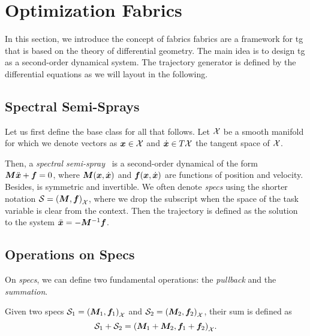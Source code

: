 
\section{Optimization Fabrics} %
\label{sec:optimization_fabrics}

In this section, we introduce the concept of \acf{fabrics}
\ac{fabrics} are a framework for \ac{tg}
that is based on the theory of differential
geometry. The main idea is to design \ac{tg} as a
second-order dynamical system. The trajectory generator is
defined by the differential equations as we will layout in
the following.

\subsection{Spectral Semi-Sprays} %
\label{sub:spectral_semi_sprays}

Let us first define the base class for all that follows.
Let $\mathcal{X}$ be a smooth manifold for which we denote vectors as 
$\bm{x}\in\mathcal{X}$ and $\dot{\bm{x}}\in T\mathcal{X}$ the tangent space of $\mathcal{X}$.

Then, a \textit{spectral semi-spray}~\cite{Ratliff2020} is a
second-order dynamical of the form $\bm{M}\ddot{\bm{x}} + \bm{f} = 0$,
where $\bm{M}(\bm{x},\dot{\bm{x}})$ and $\bm{f}(\bm{x},\dot{\bm{x}})$ are functions of
position and velocity. Besides, \M{} is symmetric and
invertible. We often denote \textit{specs} using the shorter
notation $\mathcal{S} = \left(\bm{M},\bm{f}\right)_{\mathcal{X}}$, where we drop the subscript when
the space of the task variable is clear from the context.
Then the trajectory is defined as the solution to the system
$\ddot{\bm{x}}=-\bm{M}^{-1}\bm{f}$.


\subsection{Operations on Specs} %
\label{sub:operations_on_specs}

On \textit{specs}, we can define two fundamental operations:
the \textit{pullback} and the \textit{summation}.

Given two specs $\mathcal{S}_1 = {\left(\bm{M}_1,\bm{f}_1\right)}_{\mathcal{X}}$ and
$\mathcal{S}_2 = {\left(\bm{M}_2,\bm{f}_2\right)}_{\mathcal{X}}$, their sum is
defined as
\begin{equation}
  \mathcal{S}_1 + \mathcal{S}_2 = {\left(\bm{M}_1 + \bm{M}_2, \bm{f}_1 + \bm{f}_2\right)}_{\mathcal{X}}.
  \label{eq:summation}
\end{equation}

